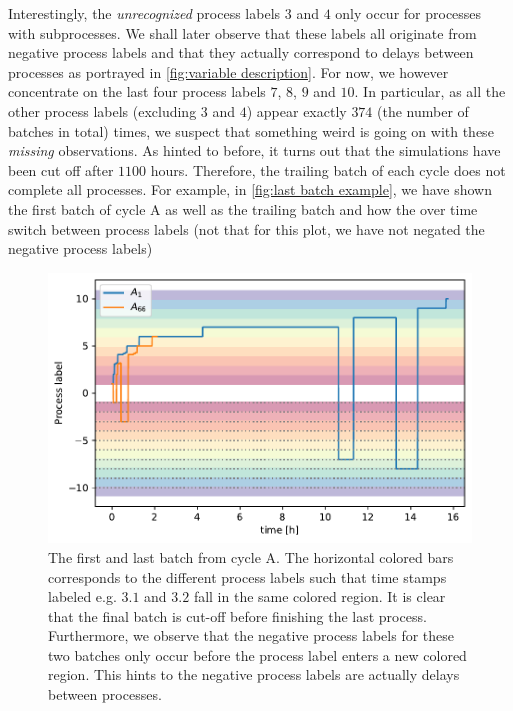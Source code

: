 \documentclass[../Thesis.tex]{subfiles}
\begin{document}

Interestingly, the \textit{unrecognized} process labels $3$ and $4$ only occur for processes with subprocesses. We shall later observe that these labels all originate from negative process labels and that they actually correspond to delays between processes as portrayed in \autoref{fig:variable description}. For now, we however concentrate on the last four process labels $7$, $8$, $9$ and $10$. In particular, as all the other process labels (excluding $3$ and $4$) appear exactly $374$ (the number of batches in total) times, we suspect that something weird is going on with these \textit{missing} observations. As hinted to before, it turns out that the simulations have been cut off after $1100$ hours. Therefore, the trailing batch of each cycle does not complete all processes. For example, in \autoref{fig:last batch example}, we have shown the first batch of cycle A as well as the trailing batch and how the over time switch between process labels (not that for this plot, we have not negated the negative process labels)

\begin{figure}[ht]
    \centering
    \includegraphics[width=0.75\linewidth]{figures/Multiple cycles data/tailing batch short.pdf}
    \caption{The first and last batch from cycle A. The horizontal colored bars corresponds to the different process labels such that time stamps labeled e.g. $3.1$ and $3.2$ fall in the same colored region. It is clear that the final batch is cut-off before finishing the last process. Furthermore, we observe that the negative process labels for these two batches only occur before the process label enters a new colored region. This hints to the negative process labels are actually delays between processes.}
    \label{fig:last batch example}
\end{figure}
\end{document}

